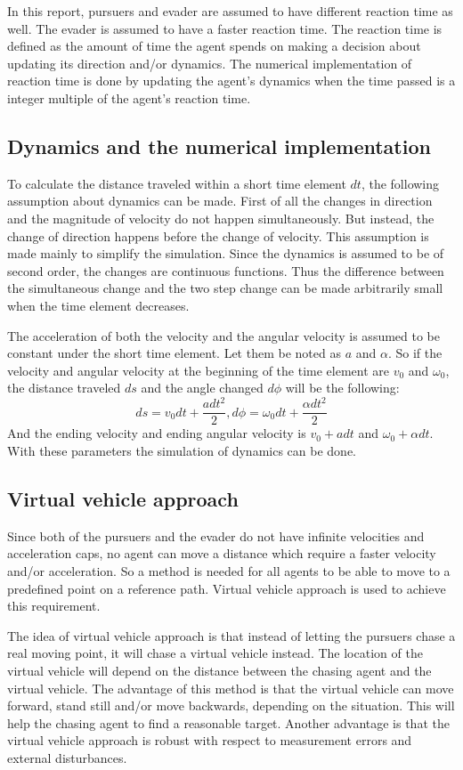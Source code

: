 \documentclass[ebook,11pt] {kth-mag}
\begin{document}
In this report, pursuers and evader are assumed to have different reaction time as well. The evader is assumed to have a faster reaction time. The reaction time is defined as the amount of time the agent spends on making a decision about updating its direction and/or dynamics. The numerical implementation of reaction time is done by updating the agent's dynamics when the time passed is a integer multiple of the agent's reaction time. 

\subsection{Dynamics and the numerical implementation}
To calculate the distance traveled within a short time element $dt$, the following assumption about dynamics can be made. First of all the changes in direction and the magnitude of velocity do not happen simultaneously. But instead, the change of direction happens before the change of velocity. This assumption is made mainly to simplify the simulation. Since the dynamics is assumed to be of second order, the changes are continuous functions. Thus the difference between the simultaneous change and the two step change can be made arbitrarily small when the time element decreases. 

The acceleration of both the velocity and the angular velocity is assumed to be constant under the short time element. Let them be noted as $a$ and $\alpha$. So if the velocity and angular velocity at the beginning of the time element are $v_0$ and $\omega_0$, the distance traveled $ds$ and the angle changed $d\phi$ will be the following:
$$
ds = v_0 dt + \frac{a dt^2}{2}, d\phi = \omega_0 dt + \frac{\alpha dt^2}{2}
$$
And the ending velocity and ending angular velocity is $v_0 + a dt$ and $\omega_0 + \alpha dt$. 
With these parameters the simulation of dynamics can be done. 

\subsection{Virtual vehicle approach}
Since both of the pursuers and the evader do not have infinite velocities and acceleration caps, no agent can move a distance which require a faster velocity and/or acceleration. So a method is needed for all agents to be able to move to a predefined point on a reference path. Virtual vehicle approach is used to achieve this requirement. 
\cite{vva}

The idea of virtual vehicle approach is that instead of letting the pursuers chase a real moving point, it will chase a virtual vehicle instead. The location of the virtual vehicle will depend on the distance between the chasing agent and the virtual vehicle. The advantage of this method is that the virtual vehicle can move forward, stand still and/or move backwards, depending on the situation. This will help the chasing agent to find a reasonable target. 
Another advantage is that the virtual vehicle approach is robust with respect to measurement errors and external disturbances. 
\end{document}
